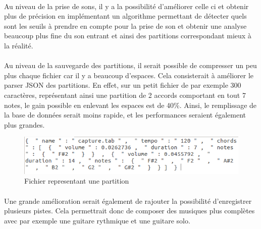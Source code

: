\paragraph{}
Au niveau de la prise de sons, il y a la possibilité d'améliorer celle ci et obtenir plus de précision 
en implémentant un algorithme permettant de détecter quels sont les seuils à prendre en compte pour la prise de son 
et obtenir une analyse beaucoup plus fine du son entrant et ainsi des partitions correspondant mieux à la 
réalité. 
\paragraph{}
Au niveau de la sauvegarde des partitions, il serait possible de compresser un peu plus chaque fichier 
car il y a beaucoup d'espaces. Cela consisterait à améliorer le parser JSON des partitions. En effet, sur un petit fichier 
de par exemple 300 caractères, représentant ainsi une partition de 2 accords comportant en tout 7 notes, le gain 
possible en enlevant les espaces est de 40\%. Ainsi, le remplissage de la base de données serait moins rapide, 
et les performances seraient également plus grandes.

\begin{figure}[H]
\centering
\includegraphics[scale=0.5]{FichierPartition}
\caption{Fichier representant une partition}
\end{figure}


\paragraph{}
Une grande amélioration serait également de rajouter la possibilité d'enregistrer plusieurs pistes. Cela permettrait donc de 
composer des musiques plus complètes avec par exemple une guitare rythmique et une guitare solo.